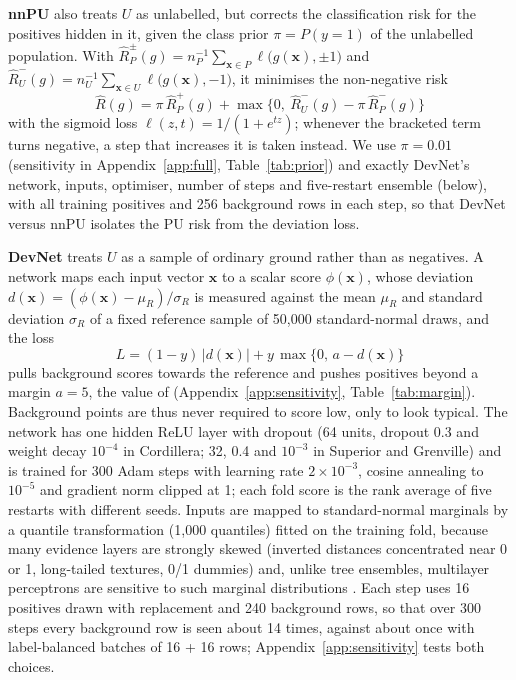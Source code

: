 \documentclass[pdflatex,sn-apa]{sn-jnl}
\begin{document}
\textbf{nnPU} \citep{Kiryo2017} also treats $U$ as unlabelled, but corrects the classification risk for the positives hidden in it, given the class prior $\pi = P(y=1)$ of the unlabelled population. With $\hat R_P^{\pm}(g) = n_P^{-1}\sum_{\mathbf{x}\in P}\ell\big(g(\mathbf{x}),\pm 1\big)$ and $\hat R_U^{-}(g) = n_U^{-1}\sum_{\mathbf{x}\in U}\ell\big(g(\mathbf{x}),-1\big)$, it minimises the non-negative risk
\begin{equation}
\hat R(g) = \pi\, \hat R_P^{+}(g) + \max\big\{0,\ \hat R_U^{-}(g) - \pi\, \hat R_P^{-}(g)\big\}
\end{equation}
with the sigmoid loss $\ell(z, t) = 1/(1 + e^{tz})$; whenever the bracketed term turns negative, a step that increases it is taken instead. We use $\pi = 0.01$ (sensitivity in Appendix~\ref{app:full}, Table~\ref{tab:prior}) and exactly DevNet's network, inputs, optimiser, number of steps and five-restart ensemble (below), with all training positives and 256 background rows in each step, so that DevNet versus nnPU isolates the PU risk from the deviation loss.

\textbf{DevNet} \citep{Pang2019} treats $U$ as a sample of ordinary ground rather than as negatives. A network maps each input vector $\mathbf{x}$ to a scalar score $\phi(\mathbf{x})$, whose deviation $d(\mathbf{x}) = (\phi(\mathbf{x}) - \mu_R)/\sigma_R$ is measured against the mean $\mu_R$ and standard deviation $\sigma_R$ of a fixed reference sample of 50,000 standard-normal draws, and the loss
\begin{equation}
L = (1-y)\,|d(\mathbf{x})| + y\,\max\{0,\, a - d(\mathbf{x})\}
\end{equation}
pulls background scores towards the reference and pushes positives beyond a margin $a = 5$, the value of \citet{Pang2019} (Appendix~\ref{app:sensitivity}, Table~\ref{tab:margin}). Background points are thus never required to score low, only to look typical. The network has one hidden ReLU layer with dropout (64 units, dropout 0.3 and weight decay $10^{-4}$ in Cordillera; 32, 0.4 and $10^{-3}$ in Superior and Grenville) and is trained for 300 Adam steps \citep{Kingma2014} with learning rate $2\times10^{-3}$, cosine annealing to $10^{-5}$ and gradient norm clipped at 1; each fold score is the rank average of five restarts with different seeds. Inputs are mapped to standard-normal marginals by a quantile transformation (1,000 quantiles) fitted on the training fold, because many evidence layers are strongly skewed (inverted distances concentrated near 0 or 1, long-tailed textures, 0/1 dummies) and, unlike tree ensembles, multilayer perceptrons are sensitive to such marginal distributions \citep{Gorishniy2021,Grinsztajn2022}. Each step uses 16 positives drawn with replacement and 240 background rows, so that over 300 steps every background row is seen about 14 times, against about once with label-balanced batches of 16 + 16 rows; Appendix~\ref{app:sensitivity} tests both choices.
\end{document}
